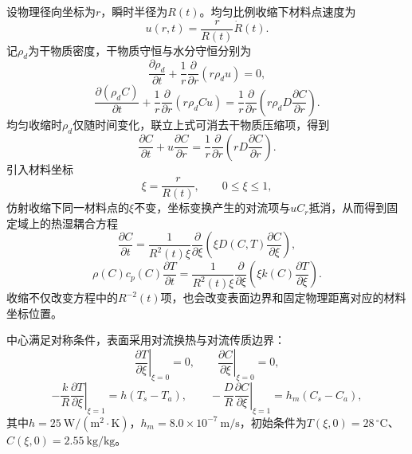 设物理径向坐标为$r$，瞬时半径为$R(t)$。均匀比例收缩下材料点速度为
\begin{equation}
u(r,t)=\frac{r}{R(t)}\dot R(t).
\end{equation}
记$\rho_d$为干物质密度，干物质守恒与水分守恒分别为
\begin{equation}
\frac{\partial \rho_d}{\partial t}
+\frac{1}{r}\frac{\partial}{\partial r}(r\rho_d u)=0,
\label{eq:q4_drymass}
\end{equation}
\begin{equation}
\frac{\partial (\rho_d C)}{\partial t}
+\frac{1}{r}\frac{\partial}{\partial r}(r\rho_d C u)
=\frac{1}{r}\frac{\partial}{\partial r}
\left(r\rho_d D\frac{\partial C}{\partial r}\right).
\label{eq:q4_watermass}
\end{equation}
均匀收缩时$\rho_d$仅随时间变化，联立上式可消去干物质压缩项，得到
\begin{equation}
\frac{\partial C}{\partial t}+u\frac{\partial C}{\partial r}
=\frac{1}{r}\frac{\partial}{\partial r}
\left(rD\frac{\partial C}{\partial r}\right).
\end{equation}
引入材料坐标
\begin{equation}
\xi=\frac{r}{R(t)},\qquad 0\leq\xi\leq1,
\end{equation}
仿射收缩下同一材料点的$\xi$不变，坐标变换产生的对流项与$uC_r$抵消，从而得到固定域上的热湿耦合方程
\begin{equation}
\frac{\partial C}{\partial t}
=\frac{1}{R^2(t)\xi}\frac{\partial}{\partial \xi}
\left(\xi D(C,T)\frac{\partial C}{\partial \xi}\right),
\label{eq:q4_c_pde}
\end{equation}
\begin{equation}
\rho(C)c_p(C)\frac{\partial T}{\partial t}
=\frac{1}{R^2(t)\xi}\frac{\partial}{\partial \xi}
\left(\xi k(C)\frac{\partial T}{\partial \xi}\right).
\label{eq:q4_t_pde}
\end{equation}
收缩不仅改变方程中的$R^{-2}(t)$项，也会改变表面边界和固定物理距离对应的材料坐标位置。

中心满足对称条件，表面采用对流换热与对流传质边界：
\begin{equation}
\left.\frac{\partial T}{\partial\xi}\right|_{\xi=0}=0,
\qquad
\left.\frac{\partial C}{\partial\xi}\right|_{\xi=0}=0,
\end{equation}
\begin{equation}
-\frac{k}{R}\left.\frac{\partial T}{\partial\xi}\right|_{\xi=1}
=h(T_s-T_a),\qquad
-\frac{D}{R}\left.\frac{\partial C}{\partial\xi}\right|_{\xi=1}
=h_m(C_s-C_a),
\label{eq:q4_bc}
\end{equation}
其中$h=25\ \mathrm{W/(m^2\!\cdot\!K)}$，$h_m=8.0\times10^{-7}\ \mathrm{m/s}$，初始条件为$T(\xi,0)=28\,^{\circ}\mathrm C$、$C(\xi,0)=2.55\ \mathrm{kg/kg}$。

